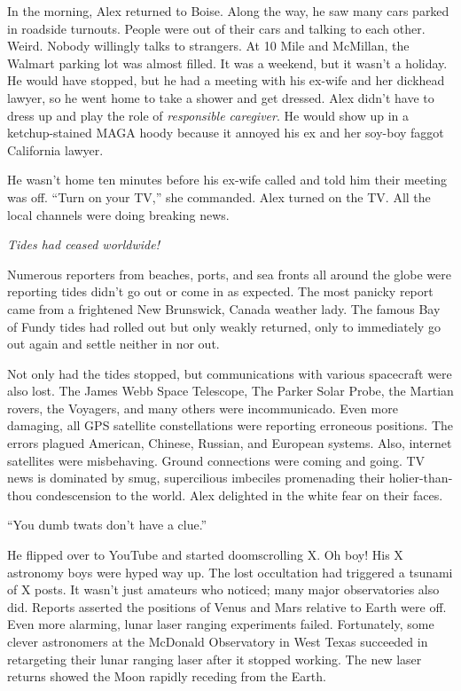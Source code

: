 In the morning, Alex returned to Boise. Along the way, he saw many cars
parked in roadside turnouts. People were out of their cars and talking
to each other. Weird. Nobody willingly talks to strangers. At 10 Mile
and McMillan, the Walmart parking lot was almost filled. It was a
weekend, but it wasn't a holiday. He would have stopped, but he had a
meeting with his ex-wife and her dickhead lawyer, so he went home to
take a shower and get dressed. Alex didn't have to dress up and play the
role of \emph{responsible caregiver}. He would show up in a
ketchup-stained MAGA hoody because it annoyed his ex and her soy-boy
faggot California lawyer.

He wasn't home ten minutes before his ex-wife called and told him their
meeting was off. ``Turn on your TV,'' she commanded. Alex turned on the
TV. All the local channels were doing breaking news.

\emph{Tides had ceased worldwide!}

Numerous reporters from beaches, ports, and sea fronts all around the
globe were reporting tides didn't go out or come in as expected. The
most panicky report came from a frightened New Brunswick, Canada weather
lady. The famous Bay of Fundy tides had rolled out but only weakly
returned, only to immediately go out again and settle neither in nor
out.

Not only had the tides stopped, but communications with various
spacecraft were also lost. The James Webb Space Telescope, The Parker
Solar Probe, the Martian rovers, the Voyagers, and many others were
incommunicado. Even more damaging, all GPS satellite constellations were
reporting erroneous positions. The errors plagued American, Chinese,
Russian, and European systems. Also, internet satellites were
misbehaving. Ground connections were coming and going. TV news is
dominated by smug, supercilious imbeciles promenading their
holier-than-thou condescension to the world. Alex delighted in the white
fear on their faces.

``You dumb twats don't have a clue.''

He flipped over to YouTube and started doomscrolling X. Oh boy! His X
astronomy boys were hyped way up. The lost occultation had triggered a
tsunami of X posts. It wasn't just amateurs who noticed; many major
observatories also did. Reports asserted the positions of Venus and Mars
relative to Earth were off. Even more alarming, lunar laser ranging
experiments failed. Fortunately, some clever astronomers at the McDonald
Observatory in West Texas succeeded in retargeting their lunar ranging
laser after it stopped working. The new laser returns showed the Moon
rapidly receding from the Earth.

